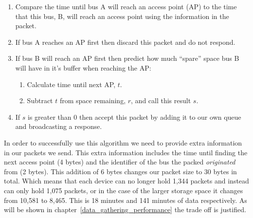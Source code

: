         \begin{enumerate}
            \item Compare the time until bus A will reach an access point (AP) to the time that this bus, B, will reach an access point using the information in the packet.
            \item If bus A reaches an AP first then discard this packet and do not respond.
            \item If bus B will reach an AP first then predict how much ``spare'' space bus B will have in it's buffer when reaching the AP:
                \begin{enumerate}
                    \item Calculate time until next AP, $t$.
                    \item Subtract $t$ from space remaining, $r$, and call this result $s$.
                \end{enumerate}
            \item If $s$ is greater than 0 then accept this packet by adding it to our own queue and broadcasting a response.
        \end{enumerate}

        In order to successfully use this algorithm we need to provide extra information in our packets we send. This extra information includes the time until finding the next access point (4 bytes) and the identifier of the bus the packed \emph{originated} from (2 bytes). This addition of 6 bytes changes our packet size to 30 bytes in total. Which means that each device can no longer hold 1,344 packets and instead can only hold 1,075 packets, or in the case of the larger storage space it changes from 10,581 to 8,465. This is 18 minutes and 141 minutes of data respectively. As will be shown in chapter~\ref{data_gathering_performance} the trade off is justified. 

